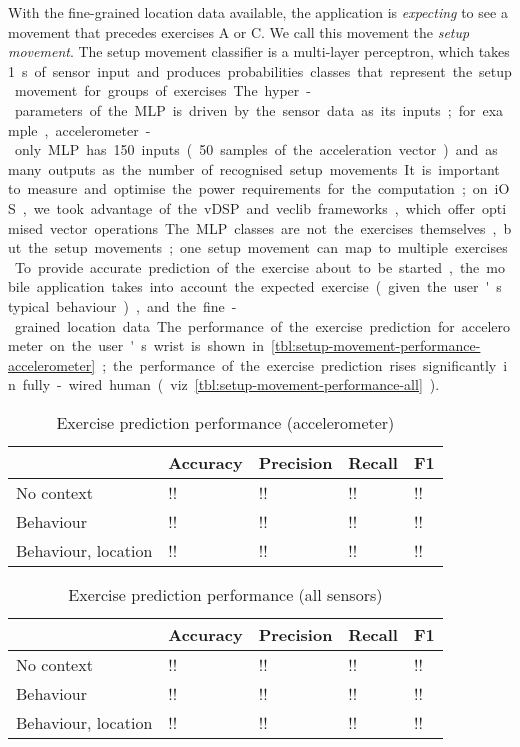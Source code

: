 \documentclass[a4paper, 10 pt, conference]{IEEEtran}
\begin{document}
With the fine-grained location data available, the application is \emph{expecting} to see a movement that precedes exercises A or C. We call this movement the \emph{setup movement}. The setup movement classifier is a multi-layer perceptron, which takes \SI{1}\second of sensor input and produces probabilities classes that represent the setup movement for groups of exercises. The hyper-parameters of the MLP is driven by the sensor data as its inputs; for example, accelerometer-only MLP has 150 inputs (50 samples of the acceleration vector) and as many outputs as the number of recognised setup movements. It is important to measure and optimise the power requirements for the computation; on iOS, we took advantage of the vDSP and veclib frameworks, which offer optimised vector operations. The MLP classes are not the exercises themselves, but the setup movements; one setup movement can map to multiple exercises. To provide accurate prediction of the exercise about to be started, the mobile application takes into account the expected exercise (given the user's typical behaviour), and the fine-grained location data. The performance of the exercise prediction for accelerometer on the user's wrist is shown in \autoref{tbl:setup-movement-performance-accelerometer}; the performance of the exercise prediction rises significantly in fully-wired human (viz \autoref{tbl:setup-movement-performance-all}).

\begin{table}[h]
\caption{Exercise prediction performance (accelerometer)}
\label{tbl:setup-movement-performance-accelerometer}
\begin{center}
\begin{tabular}{|l||m{1cm}|m{1cm}|m{1cm}|m{1cm}|}
\hline                      & Accuracy & Precision & Recall & F1 \\
\hline No context           & !!       & !!        & !!     & !! \\
\hline Behaviour            & !!       & !!        & !!     & !! \\ 
\hline Behaviour, location  & !!       & !!        & !!     & !! \\
\hline
\end{tabular}
\end{center}
\end{table}

\begin{table}[h]
\caption{Exercise prediction performance (all sensors)}
\label{tbl:setup-movement-performance-all}
\begin{center}
\begin{tabular}{|l||m{1cm}|m{1cm}|m{1cm}|m{1cm}|}
\hline                      & Accuracy & Precision & Recall & F1 \\
\hline No context           & !!       & !!        & !!     & !! \\
\hline Behaviour            & !!       & !!        & !!     & !! \\ 
\hline Behaviour, location  & !!       & !!        & !!     & !! \\
\hline
\end{tabular}
\end{center}
\end{table}
\end{document}
